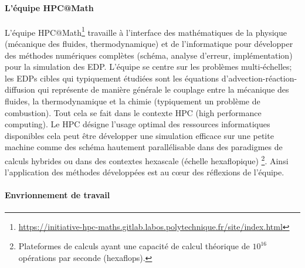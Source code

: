 \paragraph{L'équipe HPC@Math}
    L'équipe HPC@Math\footnote{\href{https://initiative-hpc-maths.gitlab.labos.polytechnique.fr/site/index.html}{https://initiative-hpc-maths.gitlab.labos.polytechnique.fr/site/index.html}} travaille à l'interface des mathématiques de la physique (mécanique des fluides, thermodynamique) et de l'informatique pour développer 
    des méthodes numériques complètes (schéma, analyse d'erreur, implémentation) pour la simulation des EDP. 
    L’équipe se centre sur les problèmes multi-échelles; les EDPs cibles qui typiquement étudiées sont les équations d'advection-réaction-diffusion qui représente 
    de manière générale le couplage entre la mécanique des fluides, la thermodynamique et la chimie (typiquement un problème de combustion).
    Tout cela se fait dans le contexte HPC (high performance computing). Le HPC désigne l'usage optimal des ressources informatiques disponibles
    cela peut être développer une simulation efficace sur une petite machine comme des schéma hautement parallélisable 
    dans des paradigmes de calculs hybrides ou dans des contextes hexascale (échelle hexaflopique)
    \footnote{Plateformes de calculs ayant une capacité de calcul théorique de $10^{16}$ opérations par seconde (hexaflops).}. 
    Ainsi l'application des méthodes développées
    est au cœur des réflexions de l'équipe. 
\paragraph{Envrionnement de travail}
